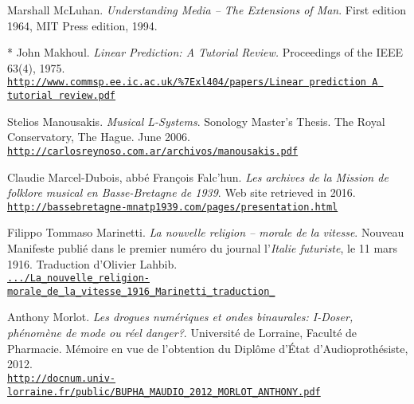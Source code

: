 \begin{thebibliography}{99}
	Marshall McLuhan. \textit{Understanding Media -- The Extensions of  Man}. First edition 1964, MIT Press edition, 1994.
	
	* John Makhoul. \textit{Linear Prediction: A Tutorial Review.} Proceedings of the IEEE 63(4), 1975.\\ \href{https://www.commsp.ee.ic.ac.uk/\%7Exl404/papers/Linear\%20prediction\%20A\%20tutorial\%20review.pdf}{\scriptsize{\texttt{http://www.commsp.ee.ic.ac.uk/\%7Exl404/papers/Linear prediction A tutorial review.pdf}}} \normalsize{}
		 
	Stelios Manousakis. \textit{Musical L-Systems}. Sonology Master's Thesis. The Royal Conservatory, The Hague. June 2006.\\ \href{http://carlosreynoso.com.ar/archivos/manousakis.pdf}{\scriptsize{\texttt{http://carlosreynoso.com.ar/archivos/manousakis.pdf}}} \normalsize{}
	
	Claudie Marcel-Dubois, abb\'e Fran\c{c}ois Falc'hun. \textit{Les archives de la Mission de folklore musical en Basse-Bretagne de 1939}. Web site retrieved in 2016.\\ 
	\href{http://bassebretagne-mnatp1939.com/pages/presentation.html}{\scriptsize{\texttt{http://bassebretagne-mnatp1939.com/pages/presentation.html}}} \normalsize{}
	
	Filippo Tommaso Marinetti. \textit{La nouvelle religion -- morale de la vitesse}. Nouveau Manifeste publi\'{e} dans le premier num\'{e}ro du journal l'\textit{Italie futuriste}, le 11 mars 1916. Traduction d'Olivier Lahbib.\\ 
	\href{https://www.academia.edu/12024655/La\_nouvelle\_religion-morale\_de\_la\_vitesse\_1916\_Marinetti\_traduction\_}{\scriptsize{\texttt{.../La\_nouvelle\_religion-morale\_de\_la\_vitesse\_1916\_Marinetti\_traduction\_}}} \normalsize{}
	
	
	Anthony Morlot. \textit{Les drogues num\'eriques et ondes
binaurales: I-Doser, ph\'enom\`ene de mode ou r\'eel danger?}. Universit\'e de Lorraine, Facult\'e de Pharmacie. M\'emoire en vue de l'obtention du Dipl\^ome d'\'Etat d'Audioproth\'esiste, 2012.\\ 
	\href{http://docnum.univ-lorraine.fr/public/BUPHA\_MAUDIO\_2012\_MORLOT\_ANTHONY.pdf}{\scriptsize{\texttt{http://docnum.univ-lorraine.fr/public/BUPHA\_MAUDIO\_2012\_MORLOT\_ANTHONY.pdf}}} \normalsize{}
	

\end{thebibliography}
